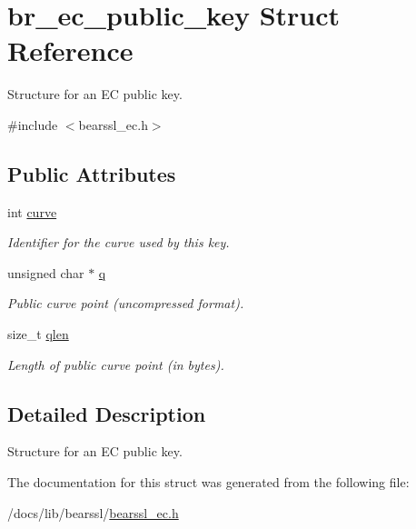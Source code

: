 \hypertarget{structbr__ec__public__key}{}\section{br\+\_\+ec\+\_\+public\+\_\+key Struct Reference}
\label{structbr__ec__public__key}


Structure for an EC public key.  




{\ttfamily \#include $<$bearssl\+\_\+ec.\+h$>$}

\subsection*{Public Attributes}
\begin{DoxyCompactItemize}
\item 
\mbox{\label{structbr__ec__public__key_a930302b66b7f28782e5aa9f4bcf22345}} 
int \hyperlink{structbr__ec__public__key_a930302b66b7f28782e5aa9f4bcf22345}{curve}
\begin{DoxyCompactList}\small\item\em Identifier for the curve used by this key. \end{DoxyCompactList}\item 
\mbox{\label{structbr__ec__public__key_a86f049d7119ab3c88c91379bfb84758c}} 
unsigned char $\ast$ \hyperlink{structbr__ec__public__key_a86f049d7119ab3c88c91379bfb84758c}{q}
\begin{DoxyCompactList}\small\item\em Public curve point (uncompressed format). \end{DoxyCompactList}\item 
\mbox{\label{structbr__ec__public__key_a6c944306cac7952ce882f4b550997201}} 
size\+\_\+t \hyperlink{structbr__ec__public__key_a6c944306cac7952ce882f4b550997201}{qlen}
\begin{DoxyCompactList}\small\item\em Length of public curve point (in bytes). \end{DoxyCompactList}\end{DoxyCompactItemize}


\subsection{Detailed Description}
Structure for an EC public key. 

The documentation for this struct was generated from the following file\+:\begin{DoxyCompactItemize}
\item 
/docs/lib/bearssl/\hyperlink{bearssl__ec_8h}{bearssl\+\_\+ec.\+h}\end{DoxyCompactItemize}
